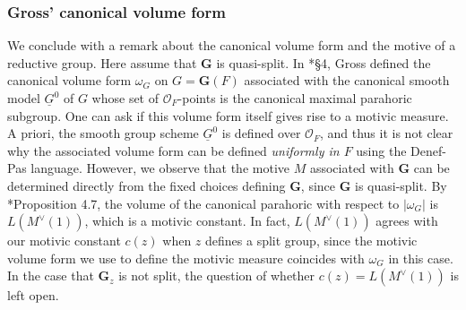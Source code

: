 \documentclass{amsart}
\newcommand{\ri}{\mathcal{O}}
\newcommand{\bG}{\mathbf{G}}
\theoremstyle{plain}
\theoremstyle{definition}
\begin{document}
\subsubsection{Gross' canonical volume form}
We conclude with a remark about the canonical volume form and the motive of a reductive group. 
Here assume that $\bG$ is quasi-split. In  \cite{gross:97a}*{\S 4}, Gross defined the canonical volume form
$\omega_G$ on $G=\bG(F)$ associated with the canonical smooth model 
$\underline{G}^0$ of $G$ whose set of $\ri_F$-points is the canonical maximal parahoric subgroup. 
One can ask if this volume form itself gives rise to a motivic measure. 
A priori, the smooth group scheme $\underline{G}^0$ is defined over $\ri_F$, and thus it is not clear why the
associated volume form can be defined \emph{uniformly in $F$} using the Denef-Pas language.
However, we observe that the motive $M$ associated with $\bG$ can be determined directly from the fixed choices defining $\bG$,
since $\bG$ is quasi-split.
By \cite{gross:97a}*{Proposition 4.7}, the volume of the canonical parahoric with respect to $|\omega_G|$
is $L(M^\vee(1))$, which is a motivic constant.
In fact, $L(M^\vee(1))$ agrees with our motivic constant $c(z)$ when $z$ defines a split group, since
the motivic volume form we use to define the motivic measure coincides with $\omega_G$ in this case.
In the case that $\bG_z$ is not split, the question of whether $c(z) = L(M^\vee(1))$  is left open.




\end{document}
